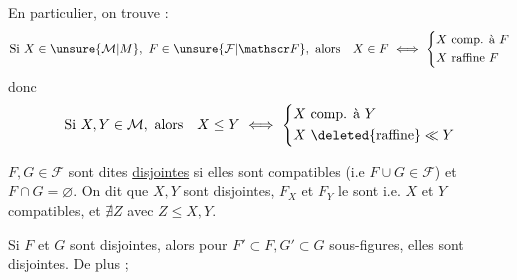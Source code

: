 En particulier, on trouve :
\[
\text{Si } X\in\unsure{\mathcal M|M},\ F\in\unsure{\mathcal F|\mathscr F},\ \text{alors}\quad X\in F\ \Longleftrightarrow\
\left\{\begin{aligned}
&X\ \text{comp. à }F\\
&X\ \text{raffine }F
\end{aligned}\right.
\]
donc
\[
\text{Si } X,Y\in\mathcal M,\ \text{alors}\quad X\leq Y\ \Longleftrightarrow\
\left\{\begin{aligned}
&X\ \text{comp. à }Y\\
&X\ \deleted{\text{raffine}}\ll Y
\end{aligned}\right.
\]


\deleted{\uline{\unsure{C 5|C 2}}} $F,G\in\mathcal F$ sont dites \uline{disjointes} si elles sont compatibles (i.e $F\cup G\in\mathcal F$) et $F\cap G=\varnothing$. On dit que $X,Y$ sont disjointes,  $F_X$ et $F_Y$ le sont i.e. $X$ et $Y$ compatibles, et $\nexists Z$ avec $Z\leq X,Y$.

Si $F$ et $G$ sont disjointes, alors pour $F'\subset F,G'\subset G$ sous-figures, elles sont disjointes. De plus ;
